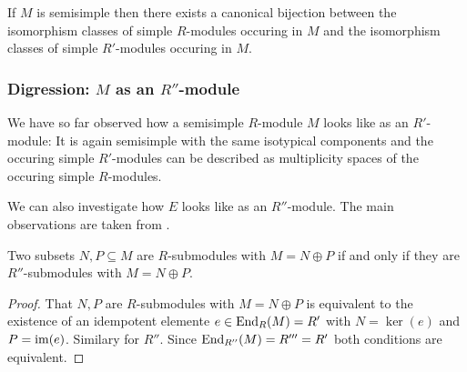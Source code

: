 \begin{corollary}
  If $M$ is semisimple then there exists a canonical bijection between the isomorphism classes of simple $R$-modules occuring in $M$ and the isomorphism classes of simple $R'$-modules occuring in $M$.
\end{corollary}







\subsubsection{Digression: $M$ as an $R''$-module}

\begin{fluff}
  We have so far observed how a semisimple $R$-module $M$ looks like as an $R'$-module:
  It is again semisimple with the same isotypical components and the occuring simple $R'$-modules can be described as multiplicity spaces of the occuring simple $R$-modules.
  
  We can also investigate how $E$ looks like as an $R''$-module.
  The main observations are taken from \cite[Chapter~2.6]{DaSilva2017NonCommutative}.
\end{fluff}


\begin{lemma}
  \label{lemma: same direct sum decompositions}
  Two subsets $N, P \subseteq M$ are $R$-submodules with $M = N \oplus P$ if and only if they are $R''$-submodules with $M = N \oplus P$.
\end{lemma}


\begin{proof}
  That $N, P$ are $R$-submodules with $M = N \oplus P$ is equivalent to the existence of an idempotent elemente $e \in \operatorname{End}_R(M) = R'$ with $N = \ker(e)$ and $P = \operatorname{im}(e)$.
  Similary for $R''$.
  Since $\operatorname{End}_{R''}(M) = R''' = R'$ both conditions are equivalent.
\end{proof}


